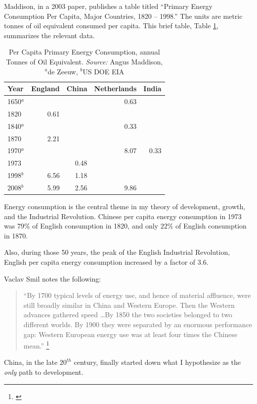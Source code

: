 \documentclass[12pt]{article}
\numberwithin{equation}{section}
\begin{document}
	Maddison, in a 2003 paper, publishes a table titled ``Primary Energy Consumption Per Capita, Major Countries, 1820 -- 1998.'' The units are metric tonnes of oil equivalent consumed per capita. This brief table, Table \ref{tab:maddison_energy}, summarizes the relevant data.
	

\begin{table}[htb]
	\centering
	

	\begin{tabular}{lrrrr}
	\hline
	Year&England&China&Netherlands&India\\
	\hline \hline
	1650$^a$&&&0.63&  \\
	1820&0.61&&&\\
	1840$^a$ &&&0.33& \\
	1870&2.21&\\
	1970$^a$ &&&8.07&0.33 \\
	1973&&0.48&&\\
	1998$^b$&6.56&1.18\\
	2008$^b$&5.99&2.56&9.86&  \\
	\hline
	\end{tabular}
	\caption{Per Capita Primary Energy Consumption,	annual Tonnes of Oil Equivalent. \textit{Source:} Angus Maddison, $^a$de Zeeuw, $^b$US DOE EIA}
	\label{tab:maddison_energy}

	\end{table}

	
	Energy consumption is the central theme in my theory of development, growth, and the Industrial Revolution. Chinese per capita energy consumption in 1973 was $79\%$ of English consumption in 1820, and only $22\%$ of English consumption in 1870.
	
	Also, during those 50 years, the peak of the English Industrial Revolution, English per capita energy consumption increased by a factor of 3.6. 
	
	Vaclav Smil notes the following:
	
	\begin{quotation}
	``By 1700 typical levels of energy use, and hence of material affluence, were still broadly similar in China and Western Europe. Then the Western advances gathered speed \ldots By 1850 the two societies belonged to two different worlds. By 1900 they were separated by an enormous performance gap: Western European energy use was at least four times the Chinese mean.'' \footnote{\citet[p.~234]{smil_energy_1994}}
	\end{quotation} 
	
	China, in the late $20^{th}$ century, finally started down what I hypothesize as the \textit{only} path to development.
	
\end{document}
